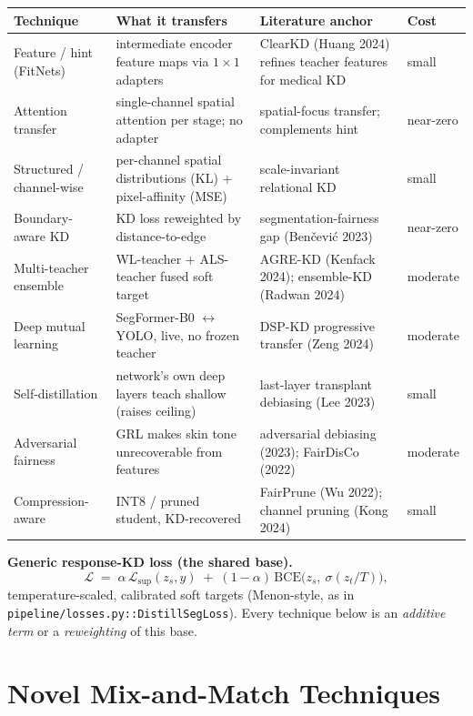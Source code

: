 \documentclass[11pt]{article}
\newcommand{\Lsup}{\mathcal{L}_{\mathrm{sup}}}
\begin{document}
\begin{center}
\small
\begin{longtable}{P{2.7cm} P{4.6cm} P{4.4cm} P{1.5cm}}
\toprule
Technique & What it transfers & Literature anchor & Cost \\
\midrule
\endhead
Feature / hint (FitNets) & intermediate encoder feature maps via $1{\times}1$ adapters & ClearKD (Huang 2024) refines teacher features for medical KD & small \\
Attention transfer & single-channel spatial attention per stage; no adapter & spatial-focus transfer; complements hint & near-zero \\
Structured / channel-wise & per-channel spatial distributions (KL) + pixel-affinity (MSE) & scale-invariant relational KD & small \\
Boundary-aware KD & KD loss reweighted by distance-to-edge & segmentation-fairness gap (Ben\v{c}evi\'c 2023) & near-zero \\
Multi-teacher ensemble & WL-teacher $+$ ALS-teacher fused soft target & AGRE-KD (Kenfack 2024); ensemble-KD (Radwan 2024) & moderate \\
Deep mutual learning & SegFormer-B0 $\leftrightarrow$ YOLO, live, no frozen teacher & DSP-KD progressive transfer (Zeng 2024) & moderate \\
Self-distillation & network's own deep layers teach shallow (raises ceiling) & last-layer transplant debiasing (Lee 2023) & small \\
Adversarial fairness & GRL makes skin tone unrecoverable from features & adversarial debiasing (2023); FairDisCo (2022) & moderate \\
Compression-aware & INT8 / pruned student, KD-recovered & FairPrune (Wu 2022); channel pruning (Kong 2024) & small \\
\bottomrule
\end{longtable}
\end{center}

\noindent\textbf{Generic response-KD loss (the shared base).}
\[
\mathcal{L} \;=\; \alpha\,\Lsup(z_s, y) \;+\; (1-\alpha)\,\mathrm{BCE}\!\big(z_s,\ \sigma(z_t/T)\big),
\]
temperature-scaled, calibrated soft targets (Menon-style, as in
\texttt{pipeline/losses.py::DistillSegLoss}). Every technique below is an
\emph{additive term} or a \emph{reweighting} of this base.

\section{Novel Mix-and-Match Techniques}
\end{document}
